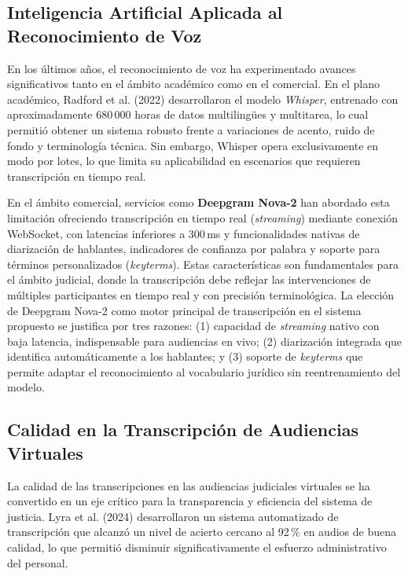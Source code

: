 \documentclass[12pt,a4paper,oneside]{report}
\begin{document}
\subsection{Inteligencia Artificial Aplicada al Reconocimiento de Voz}

En los últimos años, el reconocimiento de voz ha experimentado avances significativos tanto en el ámbito académico como en el comercial. En el plano académico, Radford et al. (2022) desarrollaron el modelo \textit{Whisper}, entrenado con aproximadamente 680\,000 horas de datos multilingües y multitarea, lo cual permitió obtener un sistema robusto frente a variaciones de acento, ruido de fondo y terminología técnica. Sin embargo, Whisper opera exclusivamente en modo por lotes, lo que limita su aplicabilidad en escenarios que requieren transcripción en tiempo real.

En el ámbito comercial, servicios como \textbf{Deepgram Nova-2} han abordado esta limitación ofreciendo transcripción en tiempo real (\textit{streaming}) mediante conexión WebSocket, con latencias inferiores a 300\,ms y funcionalidades nativas de diarización de hablantes, indicadores de confianza por palabra y soporte para términos personalizados (\textit{keyterms}). Estas características son fundamentales para el ámbito judicial, donde la transcripción debe reflejar las intervenciones de múltiples participantes en tiempo real y con precisión terminológica. La elección de Deepgram Nova-2 como motor principal de transcripción en el sistema propuesto se justifica por tres razones: (1) capacidad de \textit{streaming} nativo con baja latencia, indispensable para audiencias en vivo; (2) diarización integrada que identifica automáticamente a los hablantes; y (3) soporte de \textit{keyterms} que permite adaptar el reconocimiento al vocabulario jurídico sin reentrenamiento del modelo.

\subsection{Calidad en la Transcripción de Audiencias Virtuales}

La calidad de las transcripciones en las audiencias judiciales virtuales se ha convertido en un eje crítico para la transparencia y eficiencia del sistema de justicia. Lyra et al. (2024) desarrollaron un sistema automatizado de transcripción que alcanzó un nivel de acierto cercano al 92\,\% en audios de buena calidad, lo que permitió disminuir significativamente el esfuerzo administrativo del personal.
\end{document}
